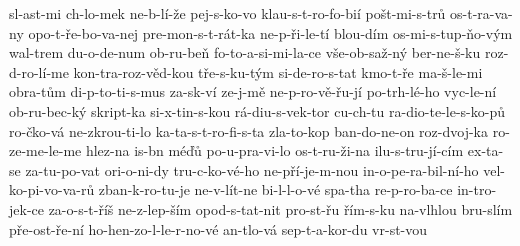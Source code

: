 {sl-ast-mi
ch-lo-mek
ne-b-lí-že
pej-s-ko-vo
klau-s-t-ro-fo-bií
pošt-mi-s-trů
os-t-ra-va-ny
opo-t-ře-bo-va-nej
pre-mon-s-t-rát-ka
ne-p-ři-le-tí
blou-dím
os-mi-s-tup-ňo-vým
wal-trem
du-o-de-num
ob-ru-beň
fo-to-a-si-mi-la-ce
vše-ob-saž-ný
ber-ne-š-ku
roz-d-ro-lí-me
kon-tra-roz-věd-kou
tře-s-ku-tým
si-de-ro-s-tat
kmo-t-ře
ma-š-le-mi
obra-tům
di-p-to-ti-s-mus
za-sk-ví
ze-j-mě
ne-p-ro-vě-řu-jí
po-trh-lé-ho
vyc-le-ní
ob-ru-bec-ký
skript-ka
si-x-tin-s-kou
rá-diu-s-vek-tor
cu-ch-tu
ra-dio-te-le-s-ko-pů
ro-čko-vá
ne-zkrou-ti-lo
ka-ta-s-t-ro-fi-s-ta
zla-to-kop
ban-do-ne-on
roz-dvoj-ka
ro-ze-me-le-me
hlez-na
is-bn
méďů
po-u-pra-vi-lo
os-t-ru-ži-na
ilu-s-tru-jí-cím
ex-ta-se
za-tu-po-vat
ori-o-ni-dy
tru-c-ko-vé-ho
ne-pří-je-m-nou
in-o-pe-ra-bil-ní-ho
vel-ko-pi-vo-va-rů
zban-k-ro-tu-je
ne-v-lít-ne
bi-l-l-o-vé
spa-tha
re-p-ro-ba-ce
in-tro-jek-ce
za-o-s-t-říš
ne-z-lep-ším
opod-s-tat-nit
pro-st-řu
řím-s-ku
na-vlhlou
bru-slím
pře-ost-ře-ní
ho-hen-zo-l-le-r-no-vé
an-tlo-vá
sep-t-a-kor-du
vr-st-vou
}
